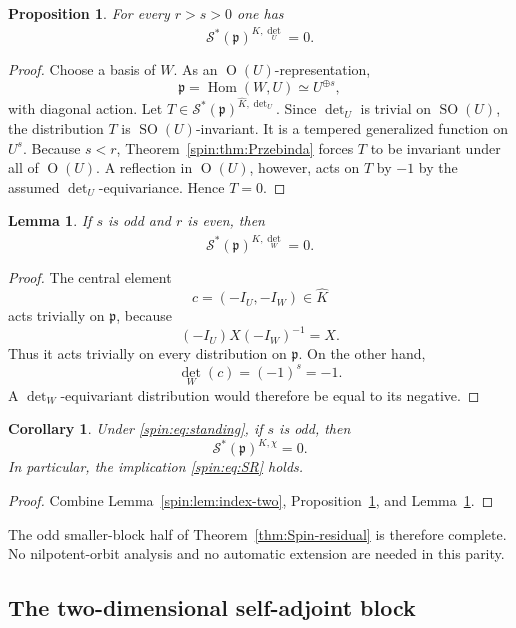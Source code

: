 \documentclass[10pt,a4paper]{amsart}
\numberwithin{equation}{section}
\newtheorem{proposition}[theorem]{Proposition}
\newtheorem{lemma}[theorem]{Lemma}
\newtheorem{corollary}[theorem]{Corollary}
\newcommand{\SO}{\operatorname{SO}}
\newcommand{\Or}{\operatorname{O}}
\newcommand{\Hom}{\operatorname{Hom}}
\newcommand{\fp}{\mathfrak p}
\newcommand{\cS}{\mathcal S}
\begin{document}
\begin{proposition}\label{spin:prop:detU-vanish}
For every $r>s>0$ one has
\[
  \cS^*(\fp)^{\widehat K,\det_U}=0.
\]
\end{proposition}

\begin{proof}
Choose a basis of $W$.  As an $\Or(U)$-representation,
\[
  \fp=\Hom(W,U)\simeq U^{\oplus s},
\]
with diagonal action.  Let
$T\in\cS^*(\fp)^{\widehat K,\det_U}$.  Since $\det_U$ is trivial on
$\SO(U)$, the distribution $T$ is $\SO(U)$-invariant.  It is a tempered
generalized function on $U^s$.  Because $s<r$, Theorem~\ref{spin:thm:Przebinda}
forces $T$ to be invariant under all of $\Or(U)$.  A reflection in $\Or(U)$,
however, acts on $T$ by $-1$ by the assumed $\det_U$-equivariance.  Hence
$T=0$.
\end{proof}

\begin{lemma}\label{spin:lem:detW-odd}
If $s$ is odd and $r$ is even, then
\[
  \cS^*(\fp)^{\widehat K,\det_W}=0.
\]
\end{lemma}

\begin{proof}
The central element
\[
  c=(-I_U,-I_W)\in\widehat K
\]
acts trivially on $\fp$, because
\[
  (-I_U)X(-I_W)^{-1}=X.
\]
Thus it acts trivially on every distribution on $\fp$.  On the other hand,
\[
  \det_W(c)=(-1)^s=-1.
\]
A $\det_W$-equivariant distribution would therefore be equal to its negative.
\end{proof}

\begin{corollary}\label{spin:cor:odd-sign-zero}
Under \eqref{spin:eq:standing}, if $s$ is odd, then
\[
  \cS^*(\fp)^{K,\chi}=0.
\]
In particular, the implication \eqref{spin:eq:SR} holds.
\end{corollary}

\begin{proof}
Combine Lemma~\ref{spin:lem:index-two}, Proposition~\ref{spin:prop:detU-vanish}, and
Lemma~\ref{spin:lem:detW-odd}.
\end{proof}

The odd smaller-block half of Theorem~\ref{thm:Spin-residual} is therefore complete.
No nilpotent-orbit analysis and no automatic extension are needed in this
parity.

\subsection{The two-dimensional self-adjoint block}\label{spin:sec:ranktwo}
\end{document}
